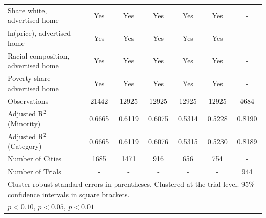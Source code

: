 \begin{table}[htbp]
{\begin{tabular}{l*{6}{c}}
\midrule
Share white, advertised home  & Yes & Yes & Yes & Yes & Yes & - \\
ln(price), advertised home  & Yes & Yes & Yes & Yes & Yes & - \\
Racial composition, advertised home & Yes & Yes & Yes & Yes & Yes & - \\
Poverty share advertised home & Yes & Yes & Yes & Yes & Yes & - \\
Observations & 21442 & 12925 & 12925 & 12925 & 12925 & 4684 \\
Adjusted R$^2$ (Minority) & 0.6665 & 0.6119 & 0.6075 & 0.5314 & 0.5228 & 0.8190 \\
Adjusted R$^2$ (Category) & 0.6665 & 0.6119 & 0.6076 & 0.5315 & 0.5230 & 0.8189 \\
Number of Cities & 1685 & 1471 & 916 & 656 & 754 & - \\
Number of Trials & - & - & - & - & - & 944 \\
\bottomrule
\multicolumn{7}{l}{\footnotesize Cluster-robust standard errors in parentheses. Clustered at the trial level. 95\% confidence intervals in square brackets.}\\
\multicolumn{7}{l}{\footnotesize \sym{*} \(p<0.10\), \sym{**} \(p<0.05\), \sym{***} \(p<0.01\)}\\
\end{tabular}
}
\end{table}
